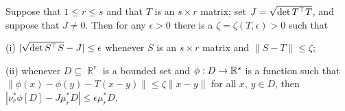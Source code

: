  Suppose that $1\le r\le s$ and that $T$ is an
$s\times r$ matrix;  set $J=\sqrt{\det T^{\top} T}$, and suppose that 
$J\ne 0$.
Then for any $\epsilon>0$ there is a $\zeta=\zeta(T,\epsilon)>0$ such
that

(i) $|\sqrt{\det S^{\top} S}-J|\le\epsilon$ whenever $S$ is an $s\times r$
matrix and $\|S-T\|\le\zeta$;

(ii) whenever $D\subseteq\BbbR^r$ is a bounded set and $\phi:D\to\Bbb
R^s$ is a function such that
$\|\phi(x)-\phi(y)-T(x-y)\|\le\zeta\|x-y\|$
for all $x$, $y\in D$, then
$|\nu_r^*\phi[D]-J\mu_r^*D|\le\epsilon\mu_r^*D$.

